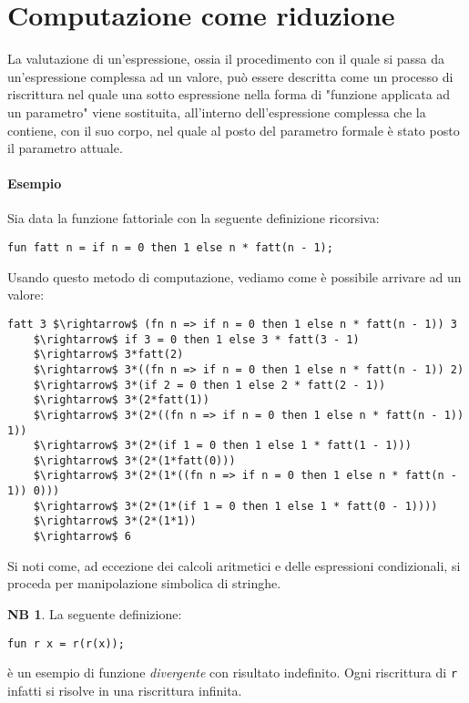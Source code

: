 \documentclass[12pt, a4paper]{report}
\theoremstyle{definition}
\newtheorem*{note}{NB}
\newcommand{\code}[1]{\texttt{#1}}
\begin{document}
\section{Computazione come riduzione}
La valutazione di un'espressione, ossia il procedimento con il quale si passa da
un'espressione complessa ad un valore, può essere descritta come un processo di
riscrittura nel quale una sotto espressione nella forma di "funzione applicata ad
un parametro" viene sostituita, all'interno dell'espressione complessa che la
contiene, con il suo corpo, nel quale al posto del parametro formale è stato posto
il parametro attuale.

\paragraph{Esempio}
Sia data la funzione fattoriale con la seguente definizione ricorsiva:
\begin{lstlisting}
fun fatt n = if n = 0 then 1 else n * fatt(n - 1);
\end{lstlisting}
Usando questo metodo di computazione, vediamo come è possibile arrivare ad un
valore:
\begin{lstlisting}[mathescape]
fatt 3 $\rightarrow$ (fn n => if n = 0 then 1 else n * fatt(n - 1)) 3
    $\rightarrow$ if 3 = 0 then 1 else 3 * fatt(3 - 1)
    $\rightarrow$ 3*fatt(2)
    $\rightarrow$ 3*((fn n => if n = 0 then 1 else n * fatt(n - 1)) 2)
    $\rightarrow$ 3*(if 2 = 0 then 1 else 2 * fatt(2 - 1))
    $\rightarrow$ 3*(2*fatt(1))
    $\rightarrow$ 3*(2*((fn n => if n = 0 then 1 else n * fatt(n - 1)) 1))
    $\rightarrow$ 3*(2*(if 1 = 0 then 1 else 1 * fatt(1 - 1)))
    $\rightarrow$ 3*(2*(1*fatt(0)))
    $\rightarrow$ 3*(2*(1*((fn n => if n = 0 then 1 else n * fatt(n - 1)) 0)))
    $\rightarrow$ 3*(2*(1*(if 1 = 0 then 1 else 1 * fatt(0 - 1))))
    $\rightarrow$ 3*(2*(1*1))
    $\rightarrow$ 6
\end{lstlisting}

Si noti come, ad eccezione dei calcoli aritmetici e delle espressioni
condizionali, si proceda per manipolazione simbolica di stringhe.

\begin{note}
    La seguente definizione:
    \begin{lstlisting}
fun r x = r(r(x));
    \end{lstlisting}
    è un esempio di funzione \emph{divergente} con risultato indefinito. Ogni
    riscrittura di \code{r} infatti si risolve in una riscrittura infinita.
\end{note}
\end{document}
